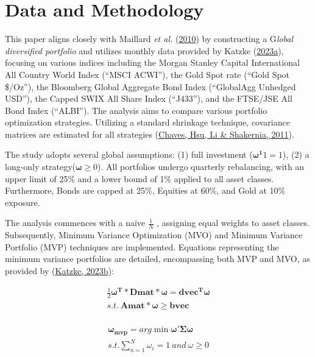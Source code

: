 \documentclass[12pt,preprint, authoryear]{elsarticle}
\numberwithin{equation}{section}
\numberwithin{figure}{section}
\numberwithin{table}{section}
\begin{document}
\hypertarget{data-and-methodology}{%
\section{\texorpdfstring{Data and Methodology
\label{-}}{Data and Methodology }}\label{data-and-methodology}}

This paper aligns closely with Maillard \emph{et al.}
(\protect\hyperlink{ref-maillard2010properties}{2010}) by constructing a
G\emph{lobal diversified portfolio} and utilizes monthly data provided
by Katzke (\protect\hyperlink{ref-katzke2023portfoliocourse}{2023a}),
focusing on various indices including the Morgan Stanley Capital
International All Country World Index (``MSCI ACWI''), the Gold Spot
rate (``Gold Spot \$/Oz''), the Bloomberg Global Aggregate Bond Index
(``GlobalAgg Unhedged USD''), the Capped SWIX All Share Index
(``J433''), and the FTSE/JSE All Bond Index (``ALBI''). The analysis
aims to compare various portfolio optimization strategies. Utilizing a
standard shrinkage technique, covariance matrices are estimated for all
strategies (\protect\hyperlink{ref-chaves2011risk}{Chaves, Hsu, Li \&
Shakernia, 2011}).

The study adopts several global assumptions: (1) full investment
(\(\boldsymbol{\omega^1} 1=1\)), (2) a long-only
strategy(\(\boldsymbol{\omega} \ge 0\)). All portfolios undergo
quarterly rebalancing, with an upper limit of 25\% and a lower bound of
1\% applied to all asset classes. Furthermore, Bonds are capped at 25\%,
Equities at 60\%, and Gold at 10\% exposure.

The analysis commences with a \textnormal{na\"{i}ve} \(\frac{1}{N}\) ,
assigning equal weights to asset classes. Subsequently, Minimum Variance
Optimization (MVO) and Minimum Variance Portfolio (MVP) techniques are
implemented. Equations representing the minimum variance portfolios are
detailed, encompassing both MVP and MVO, as provided by
(\protect\hyperlink{ref-katzke2023portfolio}{Katzke, 2023b}):

\begin{align}
\frac{1}{2} \boldsymbol{\omega^T*Dmat*\omega}=\boldsymbol{dvec^T\omega} \\
s.t. \ \boldsymbol{Amat * \omega \ge bvec}\\
\end{align}

\begin{align}
 \boldsymbol{\omega_{mvp}}= arg \min \boldsymbol{\omega' \Sigma\omega} \\
  s.t. \sum_{n=1}^{N} \omega_i = 1 \ and\ \omega \ge 0
\end{align}
\end{document}
